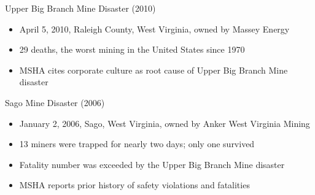 \documentclass[]{beamer}
\providecommand{\tightlist}{%
  \setlength{\itemsep}{0pt}\setlength{\parskip}{0pt}}
\begin{document}
%
%
%

\begin{frame}{Upper Big Branch Mine Disaster (2010)}

\begin{itemize}[<+->]
\tightlist
\item
  April 5, 2010, Raleigh County, West Virginia, owned by Massey Energy
\item
  29 deaths, the worst mining in the United States since 1970
\item
  MSHA cites corporate culture as root cause of Upper Big Branch Mine
  disaster
\end{itemize}

\end{frame}

\begin{frame}{Sago Mine Disaster (2006)}

\begin{itemize}[<+->]
\tightlist
\item
  January 2, 2006, Sago, West Virginia, owned by Anker West Virginia
  Mining
\item
  13 miners were trapped for nearly two days; only one survived
\item
  Fatality number was exceeded by the Upper Big Branch Mine disaster
\item
  MSHA reports prior history of safety violations and fatalities
\end{itemize}

\end{frame}
\end{document}
